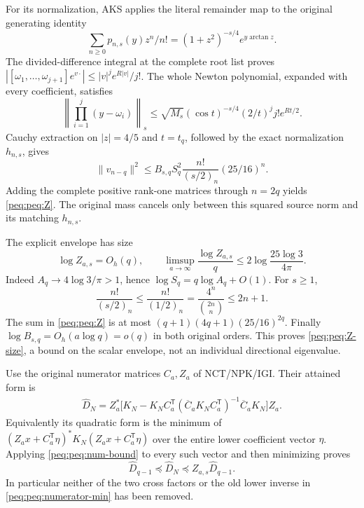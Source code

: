 For its normalization, AKS applies the literal remainder map to the original generating identity
\[
 \sum_{n\ge0}p_{n,s}(y)z^n/n!
       =(1+z^2)^{-s/4}e^{y\arctan z}.
\]
The divided-difference integral at the complete root list proves
$|[\omega_1,\ldots,\omega_{j+1}]e^{v\cdot}|\le |v|^je^{R|v|}/j!$.
The whole Newton polynomial, expanded with every coefficient, satisfies
\[
 \left\|\prod_{i=1}^j(y-\omega_i)\right\|_s
 \le\sqrt{M_s}(\cos t)^{-s/4}(2/t)^j j!e^{Rt/2}.
\]
Cauchy extraction on $|z|=4/5$ and $t=t_q$, followed by the exact normalization $h_{n,s}$, gives
\[
 \|v_{n-q}\|^2\le
 B_{s,q}S_q^2\frac{n!}{(s/2)_n}(25/16)^n.
\]
Adding the complete positive rank-one matrices through $n=2q$ yields \eqref{peq:peq:Z}. The original mass cancels only between this squared source norm and its matching $h_{n,s}$.

The explicit envelope has size
\begin{equation}
 \log Z_{a,s}=O_h(q),\qquad
 \limsup_{a\to\infty}\frac{\log Z_{a,s}}q
 \le2\log\frac{25\log3}{4\pi}.
 \label{peq:peq:Z-size}
\end{equation}
Indeed $A_q\to4\log3/\pi>1$, hence $\log S_q=q\log A_q+O(1)$. For $s\ge1$,
\[
 \frac{n!}{(s/2)_n}\le\frac{n!}{(1/2)_n}
 =\frac{4^n}{\binom{2n}{n}}\le2n+1.
\]
The sum in \eqref{peq:peq:Z} is at most $(q+1)(4q+1)(25/16)^{2q}$. Finally $\log B_{s,q}=O_h(a\log q)=o(q)$ in both original orders. This proves \eqref{peq:peq:Z-size}, a bound on the scalar envelope, not an individual directional eigenvalue.

Use the original numerator matrices $C_a,Z_a$ of NCT/NPK/IGI. Their attained form is
\begin{equation}
\begin{split}
 \widehat D_N=Z_a^*\bigl[ K_N-K_NC_a^{\mathsf T}
 (\overline C_aK_NC_a^{\mathsf T})^{-1}
                  \overline C_aK_N\bigr]Z_a.
\end{split}\label{peq:peq:numerator-min}
\end{equation}
Equivalently its quadratic form is the minimum of
$(Z_ax+C_a^{\mathsf T}\eta)^*K_N(Z_ax+C_a^{\mathsf T}\eta)$ over the entire lower coefficient vector $\eta$. Applying \eqref{peq:peq:num-bound} to every such vector and then minimizing proves
\begin{equation}
 \widehat D_{q-1}\preceq\widehat D_N
                  \preceq Z_{a,s}\widehat D_{q-1}.
 \label{peq:peq:numerator-order}
\end{equation}
In particular neither of the two cross factors or the old lower inverse in \eqref{peq:peq:numerator-min} has been removed.

